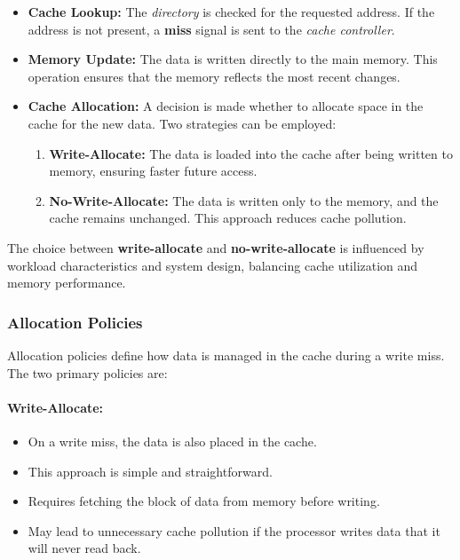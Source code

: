 \begin{itemize}
    \item \textbf{Cache Lookup:} The \textit{directory} is checked for the requested address. If the address is not present, a \textbf{miss} signal is sent to the \textit{cache controller}.
    \item \textbf{Memory Update:} The data is written directly to the main memory. This operation ensures that the memory reflects the most recent changes.
    \item \textbf{Cache Allocation:} A decision is made whether to allocate space in the cache for the new data. Two strategies can be employed:
    \begin{enumerate}
        \item \textbf{Write-Allocate:} The data is loaded into the cache after being written to memory, ensuring faster future access.
        \item \textbf{No-Write-Allocate:} The data is written only to the memory, and the cache remains unchanged. This approach reduces cache pollution.
    \end{enumerate}
\end{itemize}

The choice between \textbf{write-allocate} and \textbf{no-write-allocate} is influenced by workload characteristics and system design, balancing cache utilization and memory performance.

\subsubsection{Allocation Policies}

Allocation policies define how data is managed in the cache during a write miss. The two primary policies are:

\paragraph{Write-Allocate:}
\begin{itemize}
    \item On a write miss, the data is also placed in the cache.
    \item This approach is simple and straightforward.
    \item Requires fetching the block of data from memory before writing.
    \item May lead to unnecessary cache pollution if the processor writes data that it will never read back.
\end{itemize}

